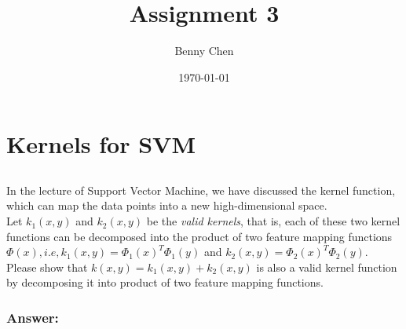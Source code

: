 \documentclass{article}
\title{Assignment 3}
\author{Benny Chen}
\date{\today}
\begin{document}
\maketitle

\section{Kernels for SVM}

\subsection{}
In the lecture of Support Vector Machine, we have discussed the kernel function, which can map the data points into a new high-dimensional space.
\\
Let $k_1(x,y)$ and $k_2(x,y)$ be the \textit{valid kernels}, that is, each of these two kernel functions can be decomposed into the product of two feature mapping functions $\Phi (x), i.e, k_1(x,y) = \Phi_1 {(x)}^T \Phi_1 (y)$ and $k_2(x,y) = \Phi_2 {(x)}^T \Phi_2 (y)$.
\\
Please show that $k(x,y) = k_1(x,y) + k_2(x,y)$ is also a valid kernel function by decomposing it into product of two feature mapping functions.

\subsubsection*{Answer:}
\end{document}
